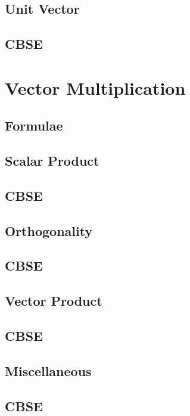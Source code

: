 \documentclass[journal]{IEEEtran}
\begin{document}
\subsection{Unit Vector}

\subsection{CBSE}

%
%
\newpage
\section{Vector Multiplication}
\subsection{Formulae}

\subsection{Scalar Product}

\subsection{CBSE}

\subsection{Orthogonality}

\subsection{CBSE}

\subsection{Vector Product}

\subsection{CBSE}

\subsection{Miscellaneous}

\subsection{CBSE}

\end{document}
